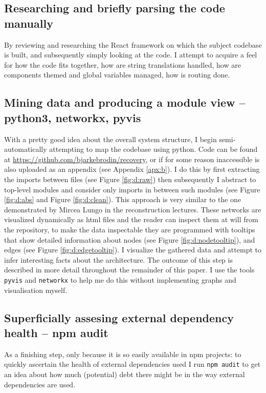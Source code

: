\documentclass{article}
\begin{document}
\subsection{Researching and briefly parsing the code manually}

By reviewing and researching the React framework on which the subject codebase is built,
and subsequently simply looking at the code. 
I attempt to acquire a feel for how the code fits together,
how are string translations handled,
how are components themed and global variables managed,
how is routing done.

\subsection{Mining data and producing a module view -- python3, networkx, pyvis}
\label{mining}

With a pretty good idea about the overall system structure,
I begin semi-automatically attempting to map the codebase using python.
Code can be found at \href{https://github.com/bjarkebrodin/recovery}{https://github.com/bjarkebrodin/recovery},
or if for some reason inaccessible is also uploaded as an appendix (see Appendix \ref{apx:b}).
I do this by first extracting the imports between files (see Figure \ref{fig:d:raw})
then subsequently I abstract to top-level modules and consider only imports in between such modules (see Figure \ref{fig:d:abs} and Figure \ref{fig:d:clean}).
This approach is very similar to the one demonstrated by Mircea Lungo in the reconstruction lectures\cite{reconstruction}.
These networks are visualized dynamically as html files and the reader can inspect them at will from the repository,
to make the data inspectable they are programmed with tooltips that show detailed information about nodes (see Figure \ref{fig:d:nodetooltip}), and edges (see Figure \ref{fig:d:edgetooltip}).
I visualize the gathered data and attempt to infer interesting facts about the architecture.
The outcome of this step is described in more detail throughout the remainder of this paper.
I use the tools \verb|pyvis|\cite{pyvis} and \verb|networkx|\cite{networkx} to help me do this without implementing graphs and visualisation myself.

\subsection{Superficially assesing external dependency health -- npm audit}

As a finishing step, only because it is so easily available in npm projects:
to quickly ascertain the health of external dependencies used I run \verb|npm audit|
to get an idea about how much (potential) debt there might be in the way external dependencies are used.
\end{document}
